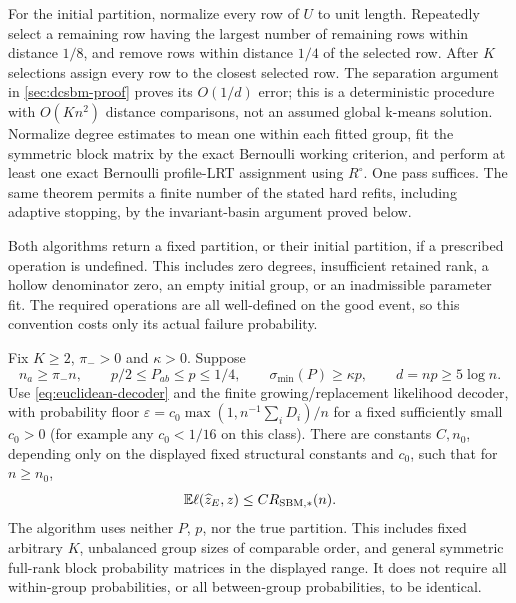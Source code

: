 For the initial partition, normalize every row of $U$ to unit length.
Repeatedly select a remaining row having the largest number of remaining
rows within distance $1/8$, and remove rows within distance $1/4$ of the
selected row. After $K$ selections assign every row to the closest selected
row. The separation argument in \cref{sec:dcsbm-proof} proves its
$O(1/d)$ error; this is a deterministic procedure with $O(Kn^2)$ distance
comparisons, not an assumed global k-means solution.
Normalize degree estimates to mean one within each fitted group, fit
the symmetric block matrix by the exact Bernoulli working criterion, and
perform at least one exact Bernoulli profile-LRT assignment using
$R^\circ$. One pass suffices. The same theorem permits a finite number of
the stated hard refits, including adaptive stopping, by the invariant-basin
argument proved below.

Both algorithms return a fixed partition, or their initial partition,
if a prescribed operation is undefined. This includes zero degrees,
insufficient retained rank, a hollow denominator zero, an empty initial
group, or an inadmissible parameter fit. The required operations are all
well-defined on the good event, so this convention costs only its actual
failure probability.

\begin{theorem}\label{thm:sbm}
Fix $K\ge2$, $\pi_->0$ and $\kappa>0$. Suppose
\[
 n_a\ge\pi_-n,\qquad
 p/2\le P_{ab}\le p\le1/4,\qquad
 \sigma_{\min}(P)\ge\kappa p,\qquad d=np\ge5\log n.
\]
Use \eqref{eq:euclidean-decoder} and the finite growing/replacement
likelihood decoder, with probability floor
$\varepsilon=c_0\max(1,n^{-1}\sum_iD_i)/n$ for a fixed sufficiently small
$c_0>0$ (for example any $c_0<1/16$ on this class).
There are constants $C,n_0$, depending only on the displayed fixed
structural constants and $c_0$, such that for $n\ge n_0$,
\begin{equation}\label{eq:sbm-risk}
 \mathbb E\ell(\widehat z_E,z)\le C R_{\mathrm{SBM},*}(n).
\end{equation}
The algorithm uses neither $P$, $p$, nor the true partition.
This includes fixed arbitrary $K$, unbalanced group sizes of comparable
order, and general symmetric full-rank block probability matrices in the
displayed range. It does not require all within-group probabilities, or all
between-group probabilities, to be identical.
\end{theorem}

